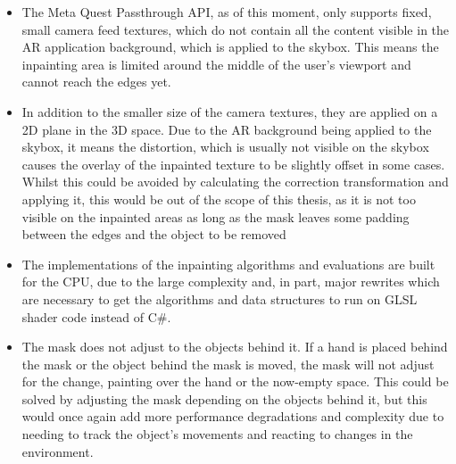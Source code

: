 \begin{itemize}
    \item The Meta Quest Passthrough API, as of this moment, only supports fixed, small camera feed textures, which do not contain all the content visible in the AR application background, which is applied to the skybox.
    This means the inpainting area is limited around the middle of the user's viewport and cannot reach the edges yet.

    \item In addition to the smaller size of the camera textures, they are applied on a 2D plane in the 3D space. Due to the AR background being applied to the skybox, it means the distortion, which is usually not visible on the skybox causes the overlay of the inpainted texture to be slightly offset in some cases.
    Whilst this could be avoided by calculating the correction transformation and applying it, this would be out of the scope of this thesis, as it is not too visible on the inpainted areas as long as the mask leaves some padding between the edges and the object to be removed

    \item The implementations of the inpainting algorithms and evaluations are built for the CPU, due to the large complexity and, in part, major rewrites which are necessary to get the algorithms and data structures to run on GLSL shader code instead of C\string#.

    \item The mask does not adjust to the objects behind it. If a hand is placed behind the mask or the object behind the mask is moved, the mask will not adjust for the change, painting over the hand or the now-empty space. This could be solved by adjusting the mask depending on the objects behind it,
    but this would once again add more performance degradations and complexity due to needing to track the object's movements and reacting to changes in the environment.
\end{itemize}